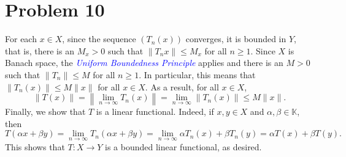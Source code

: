 \documentclass[10pt]{amsart}
\theoremstyle{thmstyle}
\theoremstyle{defstyle}
\newcommand{\K}{\mathbb{K}}
\newcommand{\define}[1]{\textcolor{blue}{\textit{#1}}}
\renewcommand{\le}{\leqslant}
\renewcommand{\ge}{\geqslant}
\begin{document}
\section{Problem 10}

For each $x\in X$, since the sequence $(T_n(x))$ converges, it is bounded in $Y$, that is, there is an $M_x > 0$ such that $\|T_n x\|\le M_x$ for all $n\ge 1$. Since $X$ is Banach space, the \define{Uniform Boundedness Principle} applies and there is an $M > 0$ such that $\|T_n\|\le M$ for all $n\ge 1$. In particular, this means that $\|T_n(x)\|\le M\|x\|$ for all $x\in X$. As a result, for all $x\in X$,
\begin{equation*}
	\|T(x)\| = \left\|\lim_{n\to\infty} T_n(x)\right\| = \lim_{n\to\infty} \|T_n(x)\|\le M\|x\|.
\end{equation*}
Finally, we show that $T$ is a linear functional. Indeed, if $x,y\in X$ and $\alpha,\beta\in\K$, then 
\begin{equation*}
	T(\alpha x + \beta y) = \lim_{n\to\infty} T_n(\alpha x + \beta y) = \lim_{n\to\infty} \alpha T_n(x) + \beta T_n(y) = \alpha T(x) + \beta T(y).
\end{equation*}
This shows that $T: X\to Y$ is a bounded linear functional, as desired.



\end{document}
